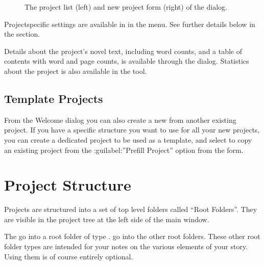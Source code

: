 \documentclass[a4paper,11pt,english]{sphinxmanual}
\begin{document}
\begin{figure}[htbp]
\centering
\capstart

\noindent{}
\caption{The project list (left) and new project form (right) of the  dialog.}\label{\detokenize{project_overview:id1}}\end{figure}

\sphinxAtStartPar
Project\sphinxhyphen{}specific settings are available in  in the  menu. See
further details below in the {\hyperref[\detokenize{project_overview:a-proj-settings}]{}} section.

\sphinxAtStartPar
Details about the project’s novel text, including word counts, and a table of contents with word
and page counts, is available through the  dialog. Statistics about the project
is also available in the  tool.


\subsection{Template Projects}
\label{\detokenize{project_overview:template-projects}}
\sphinxAtStartPar
From the Welcome dialog you can also create a new from another existing project. If you have a
specific structure you want to use for all your new projects, you can create a dedicated project to
be used as a template, and select to copy an existing project from the :guilabel:”Prefill Project”
option from the  form.


\section{Project Structure}
\label{\detokenize{project_overview:project-structure}}\label{\detokenize{project_overview:a-proj-roots}}
\sphinxAtStartPar
Projects are structured into a set of top level folders called “Root Folders”. They are visible in
the project tree at the left side of the main window.

\sphinxAtStartPar
The {\hyperref[\detokenize{int_glossary:term-Novel-Documents}]{}} go into a root folder of type . {\hyperref[\detokenize{int_glossary:term-Project-Notes}]{}} go into
the other root folders. These other root folder types are intended for your notes on the various
elements of your story. Using them is of course entirely optional.
\end{document}
